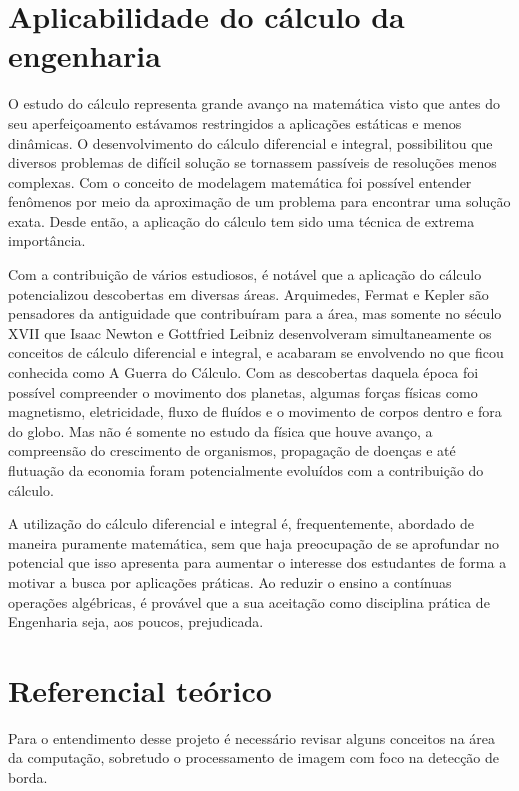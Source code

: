 \documentclass[12pt]{article}
\begin{document}
	\section{Aplicabilidade do cálculo da engenharia}
	
	O estudo do cálculo representa grande avanço na matemática visto que antes do seu aperfeiçoamento estávamos restringidos a aplicações estáticas e menos dinâmicas. O desenvolvimento do cálculo diferencial e integral, possibilitou que diversos problemas de difícil solução se tornassem passíveis de resoluções menos complexas. Com o conceito de modelagem matemática foi possível entender fenômenos por meio da aproximação de um problema para encontrar uma solução exata. Desde então, a aplicação do cálculo tem sido uma técnica de extrema importância.
	
	Com a contribuição de vários estudiosos, é notável que a aplicação do cálculo potencializou descobertas em diversas áreas. Arquimedes, Fermat e Kepler são pensadores da antiguidade que contribuíram para a área, mas somente no século XVII que Isaac Newton e Gottfried Leibniz desenvolveram simultaneamente os conceitos de cálculo diferencial e integral, e acabaram se envolvendo no que ficou conhecida como A Guerra do Cálculo. Com as descobertas daquela época foi possível compreender o movimento dos planetas, algumas forças físicas como magnetismo, eletricidade, fluxo de fluídos e o movimento de corpos dentro e fora do globo. Mas não é somente no estudo da física que houve avanço, a compreensão do crescimento de organismos, propagação de doenças e até flutuação da economia foram potencialmente evoluídos com a contribuição do cálculo.
	
	A utilização do cálculo diferencial e integral é, frequentemente, abordado de maneira puramente matemática, sem que haja preocupação de se aprofundar no potencial que isso apresenta para aumentar o interesse dos estudantes de forma a motivar a busca por aplicações práticas. Ao reduzir o ensino a contínuas operações algébricas, é provável que a sua aceitação como disciplina prática de Engenharia seja, aos poucos, prejudicada.
	
	
	\section{Referencial teórico}
	
	Para o entendimento desse projeto é necessário revisar alguns conceitos na área da computação, sobretudo o processamento de imagem com foco na detecção de borda. 
	
\end{document}
